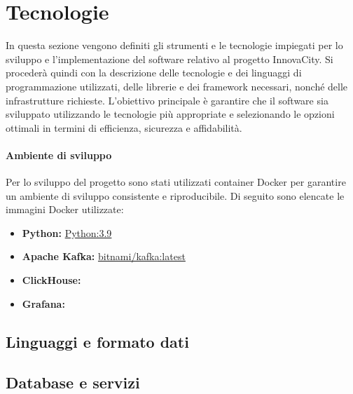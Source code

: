 \section{Tecnologie}
In questa sezione vengono definiti gli strumenti e le tecnologie impiegati per lo sviluppo e l'implementazione del software relativo al progetto InnovaCity. Si procederà quindi con la descrizione delle tecnologie e dei linguaggi di programmazione utilizzati, delle librerie e dei framework necessari, nonché delle infrastrutture richieste. L'obiettivo principale è garantire che il software sia sviluppato utilizzando le tecnologie più appropriate e selezionando le opzioni ottimali in termini di efficienza, sicurezza e affidabilità.

\paragraph*{Ambiente di sviluppo}
Per lo sviluppo del progetto sono stati utilizzati container Docker per garantire un ambiente di sviluppo consistente e riproducibile. Di seguito sono elencate le immagini Docker utilizzate:

\begin{itemize}
  \item \textbf{Python:} \href{https://hub.docker.com/_/python}{Python:3.9}
  \item \textbf{Apache Kafka:} \href{https://hub.docker.com/layers/bitnami/kafka/latest/images/sha256-4894d89d28f8e06a7d8a064efdc2dc9cb61dd205721c61296b6d033ad4824a91?context=explore}{bitnami/kafka:latest}
  \item \textbf{ClickHouse:} 
  \item \textbf{Grafana:} 
\end{itemize}
\subsection{Linguaggi e formato dati}






\subsection{Database e servizi}





